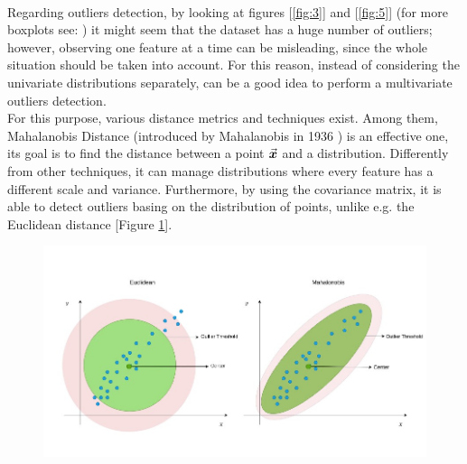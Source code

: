 \documentclass[letterpaper]{article}
\begin{document}
	\paragraph{} Regarding outliers detection, by looking at figures [\ref{fig:3}] and [\ref{fig:5}] (for more boxplots see: %
	) it might seem that the dataset has a huge number of outliers; however, observing one feature at a time can be misleading, since the whole situation should be taken into account. For this reason, instead of considering the univariate distributions separately, can be a good idea to perform a multivariate outliers detection. \\
	For this purpose, various distance metrics and techniques exist. Among them, Mahalanobis Distance (introduced by Mahalanobis in 1936 \cite{mahalanobis1936}) is an effective one, its goal is to find the distance between a point $ \va*{x} $ and a distribution. Differently from other techniques, it can manage distributions where every feature has a different scale and variance. Furthermore, by using the covariance matrix, it is able to detect outliers basing on the distribution of points, unlike e.g. the Euclidean distance [Figure \ref{fig:6}].
	\begin{figure}[h]
		\centering
		\includegraphics[width=.85\textwidth]{images/euclidean_vs_mahalanobis.jpeg}
		\label{fig:6}
	\end{figure}
	
\end{document}

